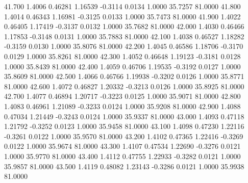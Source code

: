   41.700   1.4006   0.46281   1.16539  -0.3114   0.0134   1.0000  35.7257  81.0000
  41.800   1.4014   0.46343   1.16981  -0.3125   0.0133   1.0000  35.7473  81.0000
  41.900   1.4022   0.46405   1.17419  -0.3137   0.0132   1.0000  35.7682  81.0000
  42.000   1.4030   0.46466   1.17853  -0.3148   0.0131   1.0000  35.7883  81.0000
  42.100   1.4038   0.46527   1.18282  -0.3159   0.0130   1.0000  35.8076  81.0000
  42.200   1.4045   0.46586   1.18706  -0.3170   0.0129   1.0000  35.8261  81.0000
  42.300   1.4052   0.46648   1.19123  -0.3181   0.0128   1.0000  35.8439  81.0000
  42.400   1.4059   0.46706   1.19535  -0.3192   0.0127   1.0000  35.8609  81.0000
  42.500   1.4066   0.46766   1.19938  -0.3202   0.0126   1.0000  35.8771  81.0000
  42.600   1.4072   0.46827   1.20332  -0.3213   0.0126   1.0000  35.8925  81.0000
  42.700   1.4077   0.46894   1.20717  -0.3223   0.0125   1.0000  35.9071  81.0000
  42.800   1.4083   0.46961   1.21089  -0.3233   0.0124   1.0000  35.9208  81.0000
  42.900   1.4088   0.47034   1.21449  -0.3243   0.0124   1.0000  35.9337  81.0000
  43.000   1.4093   0.47118   1.21792  -0.3252   0.0123   1.0000  35.9458  81.0000
  43.100   1.4098   0.47230   1.22116  -0.3261   0.0122   1.0000  35.9570  81.0000
  43.200   1.4102   0.47365   1.22416  -0.3269   0.0122   1.0000  35.9674  81.0000
  43.300   1.4107   0.47534   1.22690  -0.3276   0.0121   1.0000  35.9770  81.0000
  43.400   1.4112   0.47755   1.22933  -0.3282   0.0121   1.0000  35.9857  81.0000
  43.500   1.4119   0.48082   1.23143  -0.3286   0.0121   1.0000  35.9938  81.0000
